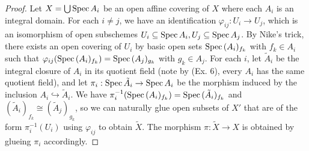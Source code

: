 \documentclass{article}
\begin{document}
\begin{enumerate} [label=\textbf{\arabic*.}, leftmargin=0em]
\begin{proof}
    Let $X = \bigcup \operatorname{Spec}{A_i}$ be an open affine covering of $X$ where each $A_i$ is an integral domain. For each $i \neq j$, we have an identification $\varphi_{ij} : U_i \to U_j$, which is an isomorphism of open subschemes $U_i \subseteq\operatorname{Spec}{A_i}, U_j \subseteq \operatorname{Spec}{A_j}$. By Nike's trick, there exists an open covering of $U_i$ by basic open sets $\operatorname{Spec}{(A_i)_{f_k}}$ with $f_k \in A_i$ such that $\varphi_{ij}(\operatorname{Spec}{(A_i)_{f_k}}) = \operatorname{Spec}{(A_j)_{g_k}}$ with $g_k \in A_j$. For each $i$, let $\tilde{A}_i$ be the integral closure of $A_i$ in its quotient field (note by (Ex. 6), every $A_i$ has the same quotient field), and let $\pi_i : \operatorname{Spec}{\tilde{A}_i} \to \operatorname{Spec}{A_i}$ be the morphism induced by the inclusion $A_i \hookrightarrow \tilde{A}_i$. We have $\pi_i^{-1}(\operatorname{Spec}{(A_i)_{f_k}}) = \operatorname{Spec}{(\tilde{A}_i)_{f_k}}$ and $(\tilde{A}_i)_{f_k} \cong (\tilde{A}_j)_{g_k}$, so we can naturally glue open subsets of $X'$ that are of the form $\pi_i^{-1}(U_i)$ using $\varphi_{ij}$ to obtain $\tilde{X}$. The morphism $\pi : \tilde{X} \to X$ is obtained by glueing $\pi_i$ accordingly.


\end{proof}
\end{enumerate}
\end{document}
